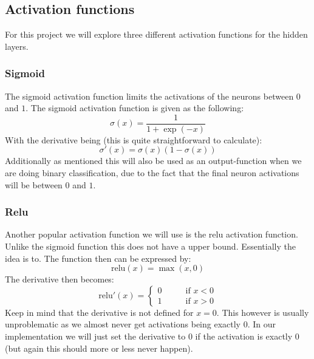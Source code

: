 \documentclass{article}
\begin{document}
\subsection{Activation functions}
For this project we will explore three different activation functions for the
hidden layers.
\subsubsection{Sigmoid}
The sigmoid activation function limits the activations of the neurons between
$0$ and $1$. The sigmoid activation function is given as the following:
$$\sigma(x) = \frac{1}{1 + \exp(-x)}$$
With the derivative being (this is quite straightforward to calculate):
$$\sigma'(x) = \sigma(x) (1 - \sigma(x))$$
Additionally as mentioned this will also be used as an output-function when we
are doing binary classification, due to the fact that the final neuron
activations will be between $0$ and $1$.

\subsubsection{Relu}
\label{relu-desc}
Another popular activation function we will use is the relu activation function.
Unlike the sigmoid function this does not have a upper bound. Essentially the
idea is to. The function then can be expressed by:
$$\text{relu}(x) = \max(x, 0)$$
The derivative then becomes:
$$\text{relu}'(x) = \begin{cases}
            0 \qquad & \text{if } x < 0 \\
            1        & \text{if } x > 0
      \end{cases}$$
Keep in mind that the derivative is not defined for $x=0$. This however is
usually unproblematic as we almost never get activations being exactly $0$. In
our implementation we will just set the derivative to $0$ if the activation is
exactly $0$ (but again this should more or less never happen).
\end{document}
